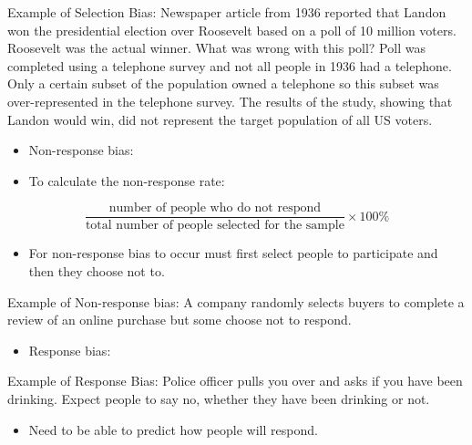 \documentclass[
]{report}
\providecommand{\tightlist}{%
  \setlength{\itemsep}{0pt}\setlength{\parskip}{0pt}}
\begin{document}
\vspace{0.5in}

Example of Selection Bias: Newspaper article from 1936 reported that Landon won the presidential election over Roosevelt based on a poll of 10 million voters. Roosevelt was the actual winner. What was wrong with this poll? Poll was completed using a telephone survey and not all people in 1936 had a telephone. Only a certain subset of the population owned a telephone so this subset was over-represented in the telephone survey. The results of the study, showing that Landon would win, did not represent the target population of all US voters.

\begin{itemize}
\tightlist
\item
  Non-response bias:
\end{itemize}

\vspace{0.5in}

\begin{itemize}
\tightlist
\item
  To calculate the non-response rate:
\end{itemize}

\[\frac{\text{number of people who do not respond}}{\text{total number of people selected for the sample}}\times 100\%\]

\begin{itemize}
\tightlist
\item
  For non-response bias to occur must first select people to participate and then they choose not to.
\end{itemize}

Example of Non-response bias: A company randomly selects buyers to complete a review of an online purchase but some choose not to respond.

\begin{itemize}
\tightlist
\item
  Response bias:
\end{itemize}

\vspace{0.5in}

Example of Response Bias: Police officer pulls you over and asks if you have been drinking. Expect people to say no, whether they have been drinking or not.

\begin{itemize}
\tightlist
\item
  Need to be able to predict how people will respond.
\end{itemize}
\end{document}
